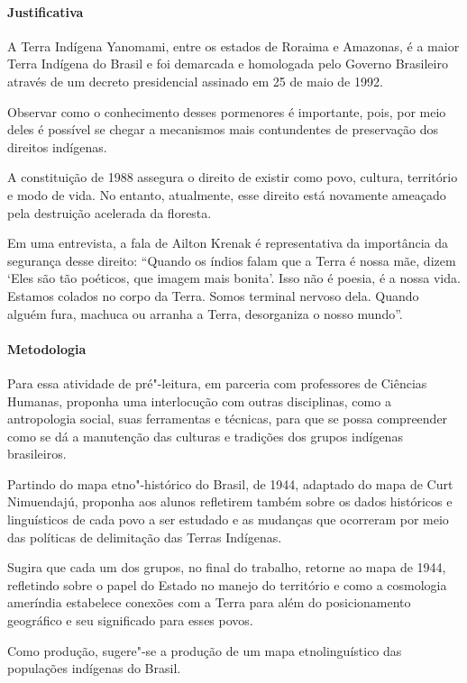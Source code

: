 \documentclass[12pt]{extarticle}
\begin{document}
{\paragraph{Justificativa} A Terra Indígena Yanomami, entre os estados de Roraima e Amazonas, 
é a maior Terra Indígena do Brasil e foi demarcada e homologada pelo Governo Brasileiro 
através de um decreto presidencial assinado em 25 de maio de 1992.

Observar como o conhecimento desses pormenores é importante, pois, por meio deles é
possível se chegar a mecanismos mais contundentes de preservação dos direitos indígenas. 

A constituição de 1988 assegura o direito de existir como povo, cultura, território e modo de vida.
No entanto, atualmente, esse direito está novamente ameaçado pela destruição acelerada da floresta.

Em uma entrevista, a fala de Ailton Krenak é representativa da importância da segurança desse direito:
``Quando os índios falam que a Terra é nossa mãe, dizem ‘Eles são tão poéticos, que imagem mais bonita’. 
Isso não é poesia, é a nossa vida. 
Estamos colados no corpo da Terra. 
Somos terminal nervoso dela. 
Quando alguém fura, machuca ou arranha a Terra, desorganiza o nosso mundo''. 

\paragraph{Metodologia}

Para essa atividade de pré"-leitura, em parceria com professores de Ciências Humanas, 
proponha uma interlocução com outras disciplinas, como a antropologia social, suas ferramentas 
e técnicas, para que se possa compreender como se dá a manutenção das culturas e tradições dos 
grupos indígenas brasileiros. 

Partindo do mapa etno"-histórico do Brasil, de 1944, adaptado do mapa de Curt Nimuendajú,
proponha aos alunos refletirem também sobre os dados históricos e linguísticos de cada povo
a ser estudado e as mudanças que ocorreram por meio das políticas de delimitação das Terras 
Indígenas. 

Sugira que cada um dos grupos, no final do trabalho, retorne ao mapa de 1944, refletindo 
sobre o papel do Estado no manejo do território e como a cosmologia ameríndia estabelece 
conexões com a Terra para além do posicionamento geográfico e seu significado para esses povos.

Como produção, sugere"-se a produção de um mapa etnolinguístico das populações indígenas do Brasil.

}
\end{document}
